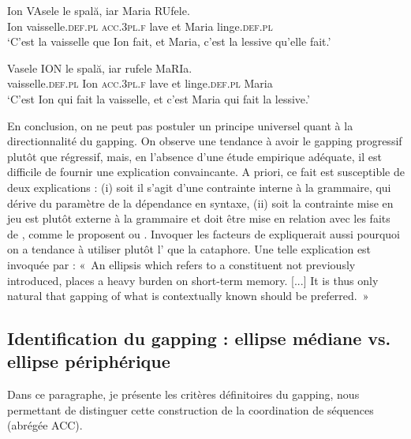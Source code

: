 \ex  
\gll Ion VAsele le spală, iar Maria RUfele. \label{ch2:ex14e} \\
Ion vaisselle.\textsc{def.pl} \textsc{acc.3pl.f} lave et Maria linge.\textsc{def.pl}\\
\glt ‘C’est la vaisselle que Ion fait, et Maria, c’est la lessive qu’elle fait.’

\ex 
\gll Vasele ION le spală, iar rufele MaRIa. \label{ch2:ex14f} \\
vaisselle.\textsc{def.pl} Ion \textsc{acc.3pl.f} lave et linge.\textsc{def.pl} Maria\\
\glt ‘C’est Ion qui fait la vaisselle, et c’est Maria qui fait la lessive.’
\z
\z

En conclusion, on ne peut pas postuler un principe universel quant à la directionnalité du gapping. On observe une tendance à avoir le gapping progressif plutôt que régressif, mais, en l’absence d’une étude empirique adéquate, il est difficile de fournir une explication convaincante. A priori, ce fait est susceptible de deux explications : (i) soit il s’agit d’une contrainte interne à la grammaire, qui dérive du paramètre de la dépendance en syntaxe, (ii) soit la contrainte mise en jeu est plutôt externe à la grammaire et doit être mise en relation avec les faits de , comme le proposent \citet{MallinsonEtAl1981} ou \citet{GaetaEtAl2001}. Invoquer les facteurs de  expliquerait aussi pourquoi on a tendance à utiliser plutôt l’ que la cataphore. Une telle explication est invoquée par \citet[90]{Ramat1987} : «~An ellipsis which refers to a constituent not previously introduced, places a heavy burden on short-term memory. [...] It is thus only natural that gapping of what is contextually known should be preferred.~»  


\subsection{Identification du gapping : ellipse médiane vs. ellipse périphérique} \label{ch2:sect2.2.2} 

Dans ce paragraphe, je présente les critères définitoires du gapping, nous permettant de distinguer cette construction de la coordination de séquences (abrégée ACC). 

